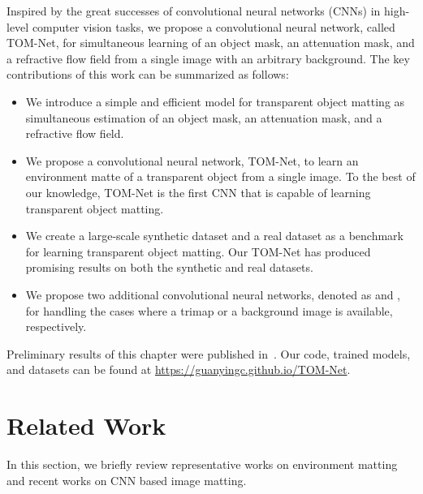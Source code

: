 Inspired by the great successes of convolutional neural networks (CNNs) in high-level computer vision tasks, we propose a convolutional neural network, called TOM-Net, for simultaneous learning of an object mask, an attenuation mask, and a refractive flow field from a single image with an arbitrary background. The key contributions of this work can be summarized as follows:

\begin{itemize}
  \item We introduce a simple and efficient model for transparent object matting as simultaneous estimation of an object mask, an attenuation mask, and a refractive flow field.
  \item We propose a convolutional neural network, TOM-Net, to learn an environment matte of a transparent object from a single image. To the best of our knowledge, TOM-Net is the first CNN that is capable of learning transparent object matting.
  \item We create a large-scale synthetic dataset and a real dataset as a benchmark for learning transparent object matting. Our TOM-Net has produced promising results on both the synthetic and real datasets.
  \item We propose two additional convolutional neural networks, denoted as \TOMNetTrimap and \TOMNetBg, for handling the cases where a trimap or a background image is available, respectively.
\end{itemize}  

Preliminary results of this chapter were published in~\cite{chen2018tomnet,chen2019learning}.
Our code, trained models, and datasets can be found at \url{https://guanyingc.github.io/TOM-Net}.

\section{Related Work}
\label{sec:related_work}
In this section, we briefly review representative works on environment matting and recent works on CNN based image matting. 

